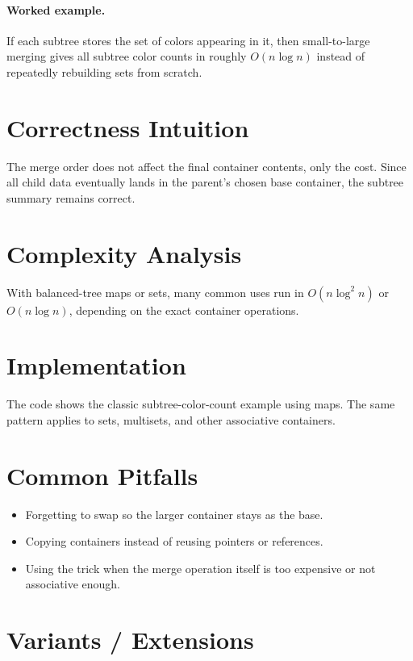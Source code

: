 \paragraph{Worked example.}
If each subtree stores the set of colors appearing in it, then small-to-large merging gives all subtree color counts in
roughly \(O(n \log n)\) instead of repeatedly rebuilding sets from scratch.

\section*{Correctness Intuition}

The merge order does not affect the final container contents, only the cost. Since all child data eventually lands in
the parent's chosen base container, the subtree summary remains correct.

\section*{Complexity Analysis}

With balanced-tree maps or sets, many common uses run in \(O(n \log^2 n)\) or \(O(n \log n)\), depending on the exact
container operations.

\section*{Implementation}

The code shows the classic subtree-color-count example using maps. The same pattern applies to sets, multisets, and
other associative containers.

\section*{Common Pitfalls}

\begin{itemize}
  \item Forgetting to swap so the larger container stays as the base.
  \item Copying containers instead of reusing pointers or references.
  \item Using the trick when the merge operation itself is too expensive or not associative enough.
\end{itemize}

\section*{Variants / Extensions}

